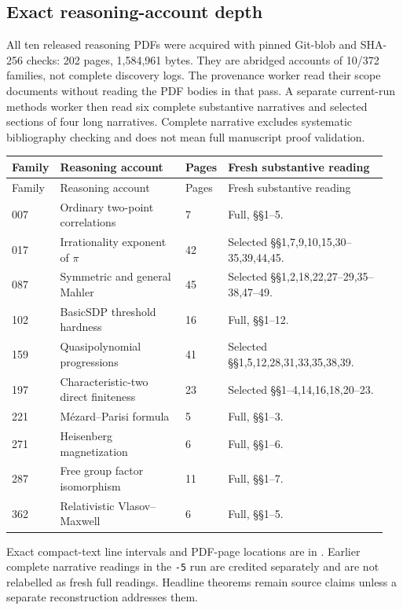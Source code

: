 \documentclass[11pt]{article}
\theoremstyle{definition}
\begin{document}
\subsection{Exact reasoning-account depth}
All ten released reasoning PDFs were acquired with pinned Git-blob and
SHA-256 checks: 202 pages, 1,584,961 bytes. They are abridged accounts of
10/372 families, not complete discovery logs. The provenance worker read
their scope documents without reading the PDF bodies in that pass.
A separate current-run methods worker then read six complete substantive
narratives and selected sections of four long narratives.
Complete narrative excludes systematic bibliography checking and does
not mean full manuscript proof validation.

\begin{longtable}{@{}p{0.10\linewidth}p{0.34\linewidth}p{0.08\linewidth}p{0.43\linewidth}@{}}
\toprule Family & Reasoning account & Pages & Fresh substantive reading\\
\midrule\endfirsthead
\toprule Family & Reasoning account & Pages & Fresh substantive reading\\
\midrule\endhead
007 & Ordinary two-point correlations & 7 & Full, \S\S1--5.\\
017 & Irrationality exponent of $\pi$ & 42 &
Selected \S\S1,7,9,10,15,30--35,39,44,45.\\
087 & Symmetric and general Mahler & 45 &
Selected \S\S1,2,18,22,27--29,35--38,47--49.\\
102 & BasicSDP threshold hardness & 16 & Full, \S\S1--12.\\
159 & Quasipolynomial progressions & 41 &
Selected \S\S1,5,12,28,31,33,35,38,39.\\
197 & Characteristic-two direct finiteness & 23 &
Selected \S\S1--4,14,16,18,20--23.\\
221 & M\'ezard--Parisi formula & 5 & Full, \S\S1--3.\\
271 & Heisenberg magnetization & 6 & Full, \S\S1--6.\\
287 & Free group factor isomorphism & 11 & Full, \S\S1--7.\\
362 & Relativistic Vlasov--Maxwell & 6 & Full, \S\S1--5.\\
\bottomrule
\end{longtable}

Exact compact-text line intervals and PDF-page locations are in
. Earlier complete narrative
readings in the \texttt{-5} run are credited separately and are not
relabelled as fresh full readings. Headline theorems remain source claims
unless a separate reconstruction addresses them.
\end{document}

